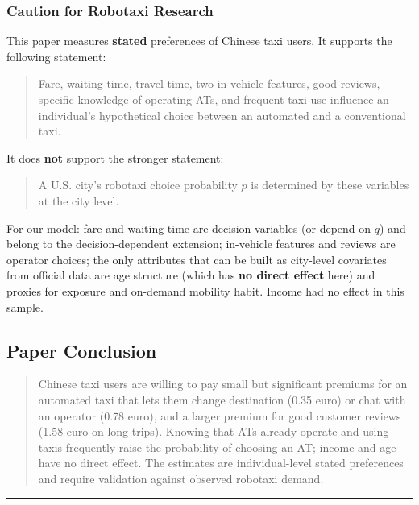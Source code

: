 \documentclass[10pt,a4paper]{article}
\begin{document}
\hypertarget{caution-for-robotaxi-research-4}{%
\subsubsection{Caution for Robotaxi Research}\label{caution-for-robotaxi-research-4}}

This paper measures \textbf{stated} preferences of Chinese taxi users. It supports the following statement:

\begin{quote}
Fare, waiting time, travel time, two in-vehicle features, good reviews, specific knowledge of operating ATs, and frequent taxi use influence an individual's hypothetical choice between an automated and a conventional taxi.
\end{quote}

It does \textbf{not} support the stronger statement:

\begin{quote}
A U.S. city's robotaxi choice probability $p$ is determined by these variables at the city level.
\end{quote}

For our model: fare and waiting time are decision variables (or depend on $q$) and belong to the decision-dependent extension; in-vehicle features and reviews are operator choices; the only attributes that can be built as city-level covariates from official data are age structure (which has \textbf{no direct effect} here) and proxies for exposure and on-demand mobility habit. Income had no effect in this sample.

\hypertarget{paper-conclusion-4}{%
\subsection{Paper Conclusion}\label{paper-conclusion-4}}

\begin{quote}
Chinese taxi users are willing to pay small but significant premiums for an automated taxi that lets them change destination (0.35 euro) or chat with an operator (0.78 euro), and a larger premium for good customer reviews (1.58 euro on long trips). Knowing that ATs already operate and using taxis frequently raise the probability of choosing an AT; income and age have no direct effect. The estimates are individual-level stated preferences and require validation against observed robotaxi demand.
\end{quote}

\begin{center}\rule{0.5\linewidth}{0.5pt}\end{center}
\end{document}
